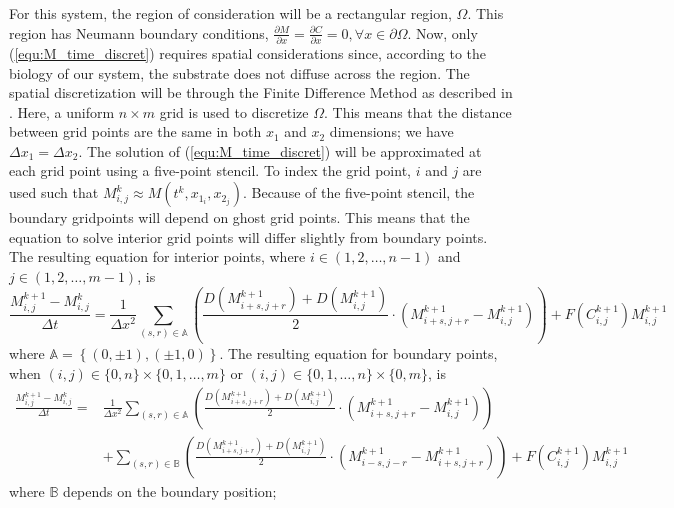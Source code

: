 For this system, the region of consideration will be a rectangular region, $\Omega$.
This region has Neumann boundary conditions, $\frac{\partial M}{\partial x} = \frac{\partial C}{\partial x} = 0, \forall x \in \partial \Omega$.
Now, only (\ref{equ:M_time_discret}) requires spatial considerations since, according to the biology of our system, the substrate does not diffuse across the region.
The spatial discretization will be through the Finite Difference Method as described in \cite{saad2003iterativeMethod}.
Here, a uniform $n \times m$ grid is used to discretize $\Omega$.
This means that the distance between grid points are the same in both $x_1$ and $x_2$ dimensions; we have $\Delta x_1 = \Delta x_2$.
The solution of (\ref{equ:M_time_discret}) will be approximated at each grid point using a five-point stencil. 
To index the grid point, $i$ and $j$ are used such that $M^{k}_{i,j} \approx M(t^{k}, x_{1_i}, x_{2_j})$.
Because of the five-point stencil, the boundary gridpoints will depend on ghost grid points.
This means that the equation to solve interior grid points will differ slightly from boundary points.
The resulting equation for interior points, where $i \in (1, 2, \ldots, n-1)$ and $j \in (1, 2, \ldots, m-1)$, is
\begin{equation} \label{equ:M_space_discret}
  \frac{M^{k+1}_{i,j} - M^{k}_{i,j}}{\Delta t} = 
    \frac{1}{\Delta x^2} \sum_{(s,r) \in \mathbb{A}} 
    \left( \frac{D(M^{k+1}_{i+s,j+r}) + D(M^{k+1}_{i,j})}{2} 
    \cdot ( M^{k+1}_{i+s, j+r} - M^{k+1}_{i,j}) \right) 
    + F(C^{k+1}_{i,j}) M^{k+1}_{i,j}
\end{equation}
where $\mathbb{A} = \left\{ (0, \pm1), (\pm1, 0) \right\}$.
The resulting equation for boundary points, when $(i,j) \in \{0,n\} \times \{0,1,\ldots,m\}$ or $(i,j) \in \{0,1,\ldots,n\} \times \{0,m\}$, is
\begin{equation} \label{equ:M_space_discret_boundary}
  \begin{aligned}
  \frac{M^{k+1}_{i,j} - M^{k}_{i,j}}{\Delta t} =& 
    \frac{1}{\Delta x^2} \sum_{(s,r) \in \mathbb{A}}
    \left( \frac{D(M^{k+1}_{i+s,j+r}) + D(M^{k+1}_{i,j})}{2}
    \cdot ( M^{k+1}_{i+s, j+r} - M^{k+1}_{i,j}) \right) \\&
    + \sum_{(s,r) \in \mathbb{B}}  
    \left( \frac{D(M^{k+1}_{i+s,j+r}) + D(M^{k+1}_{i,j})}{2}
    \cdot ( M^{k+1}_{i-s, j-r} - M^{k+1}_{i+s, j+r}) \right)
    + F(C^{k+1}_{i,j}) M^{k+1}_{i,j}
  \end{aligned}
\end{equation}
where $\mathbb{B}$ depends on the boundary position;
